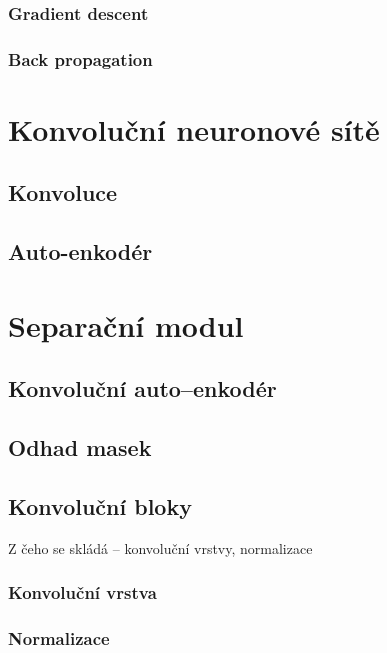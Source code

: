 \subsection{Gradient descent}

\subsection{Back propagation}



\chapter{Konvoluční neuronové sítě}
\label{konvolucni-site}

\section{Konvoluce}

\section{Auto-enkodér}



\chapter{Separační modul}
\label{separacni-modul}

\section{Konvoluční auto--enkodér}

\section{Odhad masek}

\section{Konvoluční bloky}
Z čeho se skládá -- konvoluční vrstvy, normalizace
\subsection{Konvoluční vrstva}
\subsection{Normalizace}
